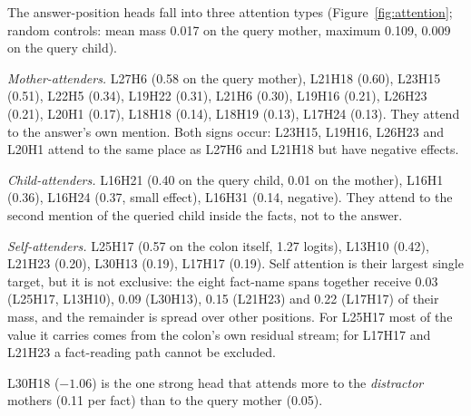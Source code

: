 \documentclass[11pt,a4paper]{article}
\begin{document}
The answer-position heads fall into three attention types (Figure~\ref{fig:attention};
random controls: mean mass 0.017 on the query mother, maximum 0.109, 0.009 on the
query child).

\emph{Mother-attenders.} L27H6 (0.58 on the query mother), L21H18 (0.60), L23H15
(0.51), L22H5 (0.34), L19H22 (0.31), L21H6 (0.30), L19H16 (0.21), L26H23 (0.21),
L20H1 (0.17), L18H18 (0.14), L18H19 (0.13), L17H24 (0.13). They attend to the answer's
own mention. Both signs occur: L23H15, L19H16, L26H23 and L20H1 attend to the same
place as L27H6 and L21H18 but have negative effects.

\emph{Child-attenders.} L16H21 (0.40 on the query child, 0.01 on the mother), L16H1
(0.36), L16H24 (0.37, small effect), L16H31 (0.14, negative). They attend to the
second mention of the queried child inside the facts, not to the answer.

\emph{Self-attenders.} L25H17 (0.57 on the colon itself, 1.27 logits), L13H10 (0.42),
L21H23 (0.20), L30H13 (0.19), L17H17 (0.19). Self attention is their largest single
target, but it is not exclusive: the eight fact-name spans together receive 0.03
(L25H17, L13H10), 0.09 (L30H13), 0.15 (L21H23) and 0.22 (L17H17) of their mass, and the
remainder is spread over other positions. For L25H17 most of the value it carries
comes from the colon's own residual stream; for L17H17 and L21H23 a fact-reading path
cannot be excluded.

L30H18 ($-1.06$) is the one strong head that attends more to the \emph{distractor}
mothers (0.11 per fact) than to the query mother (0.05).
\end{document}

